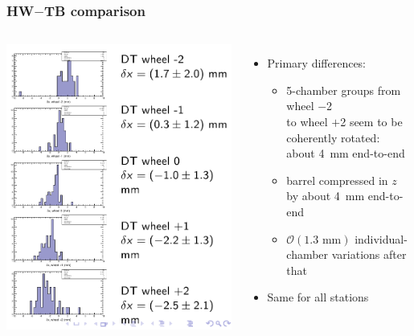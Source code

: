\documentclass[compress]{beamer}
\begin{document}
\begin{frame}
\frametitle{HW$-$TB comparison}
\begin{columns}
\includegraphics[width=\linewidth]{twist1.png}

\begin{itemize}
\item Primary differences:
\begin{itemize}\setlength{\itemsep}{0.1 cm}
\item 5-chamber groups from wheel $-$2 \\ to wheel $+$2 seem to be coherently rotated: about 4~mm end-to-end
\item barrel compressed in $z$ by about 4~mm end-to-end
\item $\mathcal{O}(1.3\mbox{ mm})$ individual-chamber variations after that
\end{itemize}
\item<2> Same for all stations
\end{itemize}


\end{columns}
\end{frame}
\end{document}
